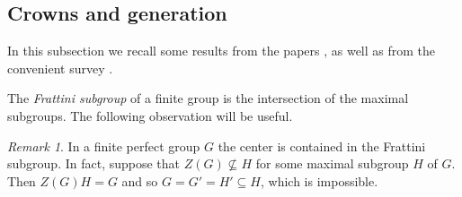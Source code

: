 \documentclass[11pt,reqno]{amsart}
\numberwithin{equation}{section}
\newtheorem{lemma}[theorem]{Lemma}
\theoremstyle{definition}
\theoremstyle{remark}
\newtheorem{remark}[theorem]{Remark}
\newcommand{\GL}{\mathop{\mathrm{GL}}}
\begin{document}

\subsection{Crowns and generation}

In this subsection we recall some results from the papers \cite{DVL98,DL03,LM02},
as well as from the convenient survey \cite{Luc23}.

The \emph{Frattini subgroup} of a finite group is the intersection of the maximal subgroups.
The following observation will be useful.

\begin{remark} \label{remZF}
In a finite perfect group $G$ the center is contained in the Frattini subgroup.
In fact, suppose that $Z(G) \nsubseteq H$ for some maximal subgroup $H$ of $G$.
Then $Z(G) H =G$ and so $G = G' = H' \subseteq H$, which is impossible.
\end{remark}
\end{document}
